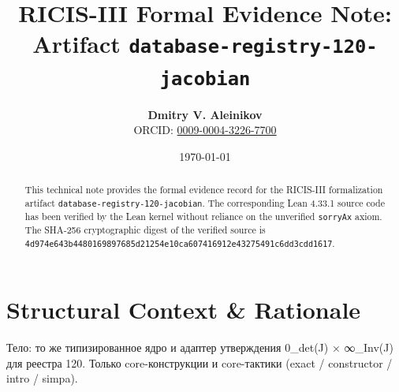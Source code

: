 \documentclass[11pt,a4paper]{article}
\title{\textbf{RICIS-III Formal Evidence Note:\\Artifact \texttt{database-registry-120-jacobian}}}
\author{\textbf{Dmitry V. Aleinikov}\\ORCID: \href{https://orcid.org/0009-0004-3226-7700}{0009-0004-3226-7700}}
\date{\today}
\begin{document}
\maketitle

\begin{abstract}
This technical note provides the formal evidence record for the RICIS-III formalization artifact \texttt{database-registry-120-jacobian}.
The corresponding Lean 4.33.1 source code has been verified by the Lean kernel without reliance on the unverified \texttt{sorryAx} axiom.
The SHA-256 cryptographic digest of the verified source is \texttt{4d974e643b4480169897685d21254e10ca607416912e43275491c6dd3cdd1617}.
\end{abstract}

\section{Structural Context & Rationale}
Тело: то же типизированное ядро и адаптер утверждения 0_det(J) × ∞_Inv(J) для реестра 120. Только core-конструкции и core-тактики (exact / constructor / intro / simpa).
\end{document}
